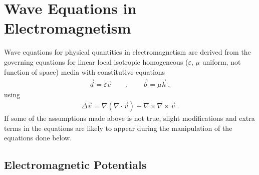 \documentclass[letterpaper,10pt,english]{jupyterBook}
\begin{document}
\section{Wave Equations in Electromagnetism}
\label{\detokenize{ch/waves-equation:wave-equations-in-electromagnetism}}\label{\detokenize{ch/waves-equation:classical-electromagnetism-waves-wave-equation}}\label{\detokenize{ch/waves-equation::doc}}
\sphinxAtStartPar
Wave equations for physical quantities in electromagnetism are derived from the governing equations for linear local isotropic homogeneous (\(\varepsilon\), \(\mu\) uniform, not function of space) media with constitutive equations
\begin{equation*}
\begin{split}\vec{d} = \varepsilon \vec{e} \qquad , \qquad \vec{b} = \mu \vec{h} \ ,\end{split}
\end{equation*}
\sphinxAtStartPar
using 
\begin{equation*}
\begin{split}\Delta \vec{v} = \nabla ( \nabla \cdot \vec{v} ) - \nabla \times \nabla \times \vec{v} \ .\end{split}
\end{equation*}
\sphinxAtStartPar
If some of the assumptions made above is not true, slight modifications and extra terms in the equations are likely to appear during the manipulation of the equations done below.


\subsection{Electromagnetic Potentials}
\label{\detokenize{ch/waves-equation:electromagnetic-potentials}}\label{\detokenize{ch/waves-equation:classical-electromagnetism-waves-wave-equation-potentials}}
\end{document}
